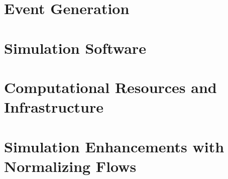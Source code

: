 \iffalse
Approaching through the lens of an inverse problem, we use existing knowledge to create event generators that produce reasonable the underlying physics processes. These computer generated datasets are then swam through microphysics simulations of the CLAS12 experiment on an event by event basis to produce a simulated dataset. By comparing the experimental data to the simulated data, and the simulated data to the model of the underlying distribution, inferences can be made about the true underlying distribution generating the experimental data. 
\todo{Fix this stupidly phrased section}
\fi


\section{Event Generation}\label{sec:ch3generator}
    
\clearpage

\section{Simulation Software}\label{sec:sim_pipeline}
 


\section{Computational Resources and Infrastructure}\label{sec:comp_infrastructure}
   
    



    

\clearpage

\section{Simulation Enhancements with Normalizing Flows}\label{sec:normflow}
    



